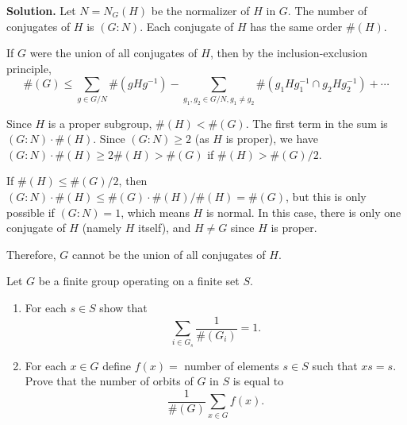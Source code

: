 \noindent\textbf{Solution.} Let $N = N_G(H)$ be the normalizer of $H$ in $G$. The number of conjugates of $H$ is $(G : N)$. Each conjugate of $H$ has the same order $\#(H)$.

If $G$ were the union of all conjugates of $H$, then by the inclusion-exclusion principle,
\[\#(G) \leq \sum_{g \in G/N} \#(gHg^{-1}) - \sum_{g_1, g_2 \in G/N, g_1 \neq g_2} \#(g_1Hg_1^{-1} \cap g_2Hg_2^{-1}) + \cdots\]

Since $H$ is a proper subgroup, $\#(H) < \#(G)$. The first term in the sum is $(G : N) \cdot \#(H)$. Since $(G : N) \geq 2$ (as $H$ is proper), we have $(G : N) \cdot \#(H) \geq 2\#(H) > \#(G)$ if $\#(H) > \#(G)/2$.

If $\#(H) \leq \#(G)/2$, then $(G : N) \cdot \#(H) \leq \#(G) \cdot \#(H)/\#(H) = \#(G)$, but this is only possible if $(G : N) = 1$, which means $H$ is normal. In this case, there is only one conjugate of $H$ (namely $H$ itself), and $H \neq G$ since $H$ is proper.

Therefore, $G$ cannot be the union of all conjugates of $H$.

\begin{problembox}
Let $G$ be a finite group operating on a finite set $S$.
\begin{enumerate}[label=(\alph*)]
\item For each $s \in S$ show that 
\[\sum_{i \in G_s} \frac{1}{\#(G_i)} = 1.\]
\item For each $x \in G$ define $f(x) = $ number of elements $s \in S$ such that $xs = s$. Prove that the number of orbits of $G$ in $S$ is equal to 
\[\frac{1}{\#(G)} \sum_{x \in G} f(x).\]
\end{enumerate}
\end{problembox}

